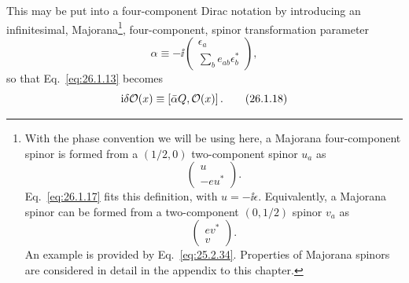 This may be put into a four-component Dirac notation by introducing an
infinitesimal, Majorana\footnote{With the phase convention we will be using
here, a Majorana four-component spinor is formed from a \((1/2,0)\)
two-component spinor \(u_a\) as
\[
  \begin{pmatrix}u\\-eu^*\end{pmatrix}.
\]
Eq.~\eqref{eq:26.1.17} fits this definition, with \(u=-\ii\epsilon\).
Equivalently, a Majorana spinor can be formed from a two-component
\((0,1/2)\) spinor \(v_a\) as
\[
  \begin{pmatrix}ev^*\\v\end{pmatrix}.
\]
An example is provided by Eq.~\eqref{eq:25.2.34}. Properties of Majorana
spinors are considered in detail in the appendix to this chapter.},
four-component, spinor transformation parameter
\begin{equation}
  \alpha\equiv-\ii
  \begin{pmatrix}
    \epsilon_a\\
    \displaystyle\sum_b e_{ab}\epsilon_b^*
  \end{pmatrix},
  \tag{26.1.17}\label{eq:26.1.17}
\end{equation}
so that Eq.~\eqref{eq:26.1.13} becomes
\begin{equation}
  \mathrm{i}\delta\mathcal{O}(x)\equiv
  [\bar{\alpha}Q,\mathcal{O}(x)]\,.
  \tag{26.1.18}\label{eq:26.1.18}
\end{equation}

